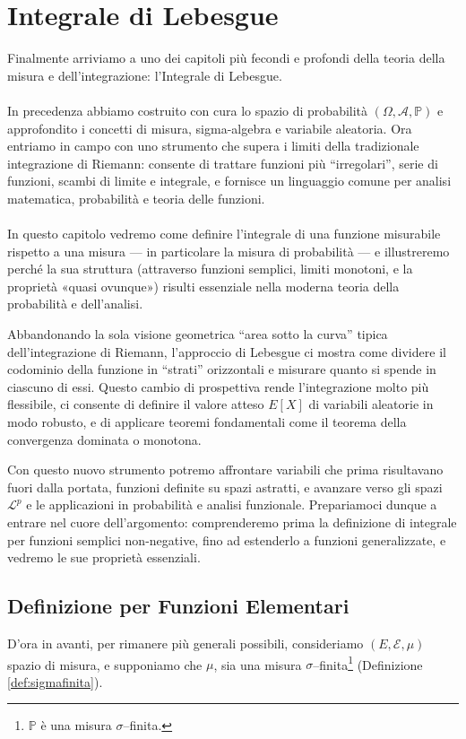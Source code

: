 \chapter{Integrale di Lebesgue}

Finalmente arriviamo a uno dei capitoli più fecondi e profondi della teoria della misura e dell’integrazione: l’Integrale di Lebesgue.\\
\\
In precedenza abbiamo costruito con cura lo spazio di probabilità $(\Omega, \mathcal{A}, \mathbb{P})$ e approfondito i concetti di misura, sigma-algebra e variabile aleatoria. Ora entriamo in campo con uno strumento che supera i limiti della tradizionale integrazione di Riemann: consente di trattare funzioni più “irregolari”, serie di funzioni, scambi di limite e integrale, e fornisce un linguaggio comune per analisi matematica, probabilità e teoria delle funzioni.\\
\\
In questo capitolo vedremo come definire l’integrale di una funzione misurabile rispetto a una misura — in particolare la misura di probabilità — e illustreremo perché la sua struttura (attraverso funzioni semplici, limiti monotoni, e la proprietà «quasi ovunque») risulti essenziale nella moderna teoria della probabilità e dell’analisi.

\medskip
\noindent Abbandonando la sola visione geometrica ``area sotto la curva'' tipica dell’integrazione di Riemann, l’approccio di Lebesgue ci mostra come dividere il codominio della funzione in “strati” orizzontali e misurare quanto si spende in ciascuno di essi. Questo cambio di prospettiva rende l’integrazione molto più flessibile, ci consente di definire il valore atteso $E[X]$ di variabili aleatorie in modo robusto, e di applicare teoremi fondamentali come il teorema della convergenza dominata o monotona.

\medskip
\noindent Con questo nuovo strumento potremo affrontare variabili che prima risultavano fuori dalla portata, funzioni definite su spazi astratti, e avanzare verso gli spazi $\mathcal{L}^p$ e le applicazioni in probabilità e analisi funzionale.
Prepariamoci dunque a entrare nel cuore dell'argomento: comprenderemo prima la definizione di integrale per funzioni semplici non-negative, fino ad estenderlo a funzioni generalizzate, e vedremo le sue proprietà essenziali.

\section{Definizione per Funzioni Elementari}
D'ora in avanti, per rimanere più generali possibili, consideriamo $(E, \mathcal{E}, \mu)$ spazio di misura, e supponiamo che $\mu$, sia una misura $\sigma$--finita\footnote{$\mathbb{P}$ è una misura $\sigma$--finita.} (Definizione \ref{def:sigmafinita}).

